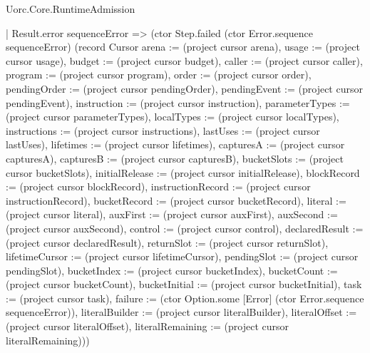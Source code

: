 \begin{lexlean}{Uorc.Core.RuntimeAdmission}
\begin{semanticmodule}
{        | Result.error sequenceError => (ctor Step.failed (ctor Error.sequence sequenceError) (record Cursor {arena := (project cursor arena), usage := (project cursor usage), budget := (project cursor budget), caller := (project cursor caller), program := (project cursor program), order := (project cursor order), pendingOrder := (project cursor pendingOrder), pendingEvent := (project cursor pendingEvent), instruction := (project cursor instruction), parameterTypes := (project cursor parameterTypes), localTypes := (project cursor localTypes), instructions := (project cursor instructions), lastUses := (project cursor lastUses), lifetimes := (project cursor lifetimes), capturesA := (project cursor capturesA), capturesB := (project cursor capturesB), bucketSlots := (project cursor bucketSlots), initialRelease := (project cursor initialRelease), blockRecord := (project cursor blockRecord), instructionRecord := (project cursor instructionRecord), bucketRecord := (project cursor bucketRecord), literal := (project cursor literal), auxFirst := (project cursor auxFirst), auxSecond := (project cursor auxSecond), control := (project cursor control), declaredResult := (project cursor declaredResult), returnSlot := (project cursor returnSlot), lifetimeCursor := (project cursor lifetimeCursor), pendingSlot := (project cursor pendingSlot), bucketIndex := (project cursor bucketIndex), bucketCount := (project cursor bucketCount), bucketInitial := (project cursor bucketInitial), task := (project cursor task), failure := (ctor Option.some [Error] (ctor Error.sequence sequenceError)), literalBuilder := (project cursor literalBuilder), literalOffset := (project cursor literalOffset), literalRemaining := (project cursor literalRemaining)}))
}
\end{semanticmodule}
\end{lexlean}
